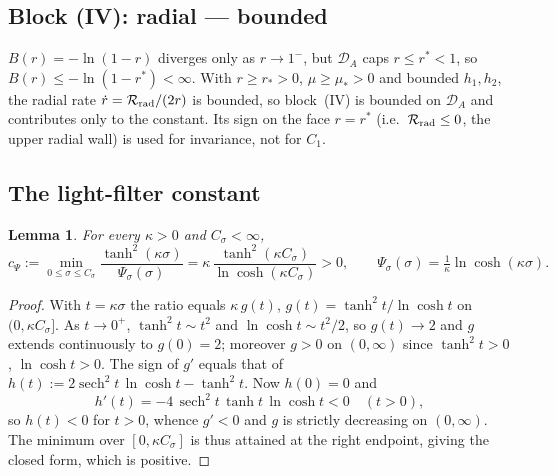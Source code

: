 \documentclass[11pt,a4paper]{article}
\newcommand{\DA}{\mathcal D_A}
\newcommand{\sech}{\operatorname{sech}}
\newcommand{\Psis}{\Psi_\sigma}
\newtheorem{lemma}{Lemma}
\theoremstyle{remark}
\begin{document}
\subsection{Block (IV): radial --- bounded}
$B(r)=-\ln(1-r)$ diverges only as $r\to1^-$, but $\DA$ caps $r\le r^*<1$, so
$B(r)\le-\ln(1-r^*)<\infty$. With $r\ge r_*>0$, $\mu\ge\mu_*>0$ and bounded
$h_1,h_2$, the radial rate $\dot r=\mathcal R_{\rm rad}/(2r)$ is bounded, so
block~(IV) is bounded on $\DA$ and contributes only to the constant. Its sign on
the face $r=r^*$ (i.e.\ $\mathcal R_{\rm rad}\le0$, the upper radial wall) is used
for invariance, not for $C_1$.

\subsection{The light-filter constant}
\begin{lemma}\label{lem:cpsi}
For every $\kappa>0$ and $C_\sigma<\infty$,
\begin{equation}
  c_\Psi:=\min_{0\le\sigma\le C_\sigma}
  \frac{\tanh^2(\kappa\sigma)}{\Psis(\sigma)}
  =\kappa\,\frac{\tanh^2(\kappa C_\sigma)}{\ln\cosh(\kappa C_\sigma)}>0,
  \qquad
  \Psis(\sigma)=\tfrac1\kappa\ln\cosh(\kappa\sigma).
\end{equation}
\end{lemma}
\begin{proof}
With $t=\kappa\sigma$ the ratio equals $\kappa\,g(t)$,
$g(t)=\tanh^2t/\ln\cosh t$ on $(0,\kappa C_\sigma]$. As $t\to0^+$,
$\tanh^2t\sim t^2$ and $\ln\cosh t\sim t^2/2$, so $g(t)\to2$ and $g$ extends
continuously to $g(0)=2$; moreover $g>0$ on $(0,\infty)$ since
$\tanh^2t>0$, $\ln\cosh t>0$. The sign of $g'$ equals that of
$h(t):=2\sech^2t\,\ln\cosh t-\tanh^2t$. Now $h(0)=0$ and
\begin{equation}
  h'(t)=-4\,\sech^2t\,\tanh t\,\ln\cosh t<0\quad(t>0),
\end{equation}
so $h(t)<0$ for $t>0$, whence $g'<0$ and $g$ is strictly decreasing on
$(0,\infty)$. The minimum over $[0,\kappa C_\sigma]$ is thus attained at the
right endpoint, giving the closed form, which is positive.
\end{proof}
\end{document}
